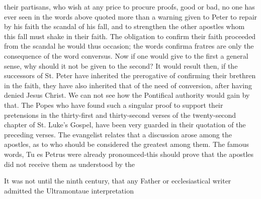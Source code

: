 their partisans, who wish at any price to procure proofs, good or bad, no one has ever seen in the words above quoted more than a warning given to Peter to repair by his faith the scandal of his fall, and to strengthen the other apostles whom this fall must shake in their faith. The obligation to confirm their faith proceeded from the scandal he would thus occasion; the words confirma fratres are only the consequence of the word conversus. Now if one would give to the first a general sense, why should it not be given to the second? It would result then, if the successors of St. Peter have inherited the prerogative of confirming their brethren in the faith, they have also inherited that of the need of conversion, after having denied Jesus Christ. We can not see how the Pontifical authority would gain by that. The Popes who have found such a singular proof to support their pretensions in the thirty-first and thirty-second verses of the twenty-second chapter of St. Luke's Gospel, have been very guarded in their quotation of the preceding verses. The evangelist relates that a discussion arose among the apostles, as to who should be considered the greatest among them. The famous words, Tu es Petrus were already pronounced-this should prove that the apostles did not receive them as understood by the

It was not until the ninth century, that any Father or ecclesiastical writer admitted the Ultramontaue interpretation

